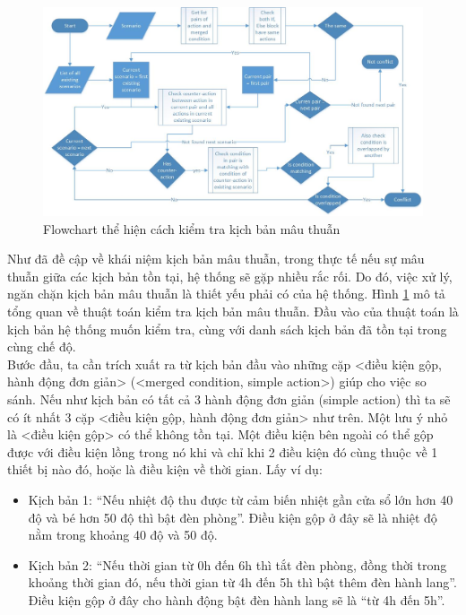 \documentclass[12pt,a4paper,oneside]{extbook}
\begin{document}
\begin{figure}[h]
  \centering
     \includegraphics[width=15cm]{6-Flowchart-Scenario-Validator-How-to-check-conflict}
  \caption{Flowchart thể hiện cách kiểm tra kịch bản mâu thuẫn}\label{fig:6-Flowchart-Scenario-Validator-How-to-check-conflict}
\end{figure}

\noindent
Như đã đề cập về khái niệm kịch bản mâu thuẫn, trong thực tế nếu sự mâu thuẫn giữa các kịch bản tồn tại, hệ thống sẽ gặp nhiều rắc rối. Do đó, việc xử lý, ngăn chặn kịch bản mâu thuẫn là thiết yếu phải có của hệ thống. Hình \ref{fig:6-Flowchart-Scenario-Validator-How-to-check-conflict} mô tả tổng quan về thuật toán kiểm tra kịch bản mâu thuẫn. Đầu vào của thuật toán là kịch bản hệ thống muốn kiểm tra, cùng với danh sách kịch bản đã tồn tại trong cùng chế độ.\\

\noindent
Bước đầu, ta cần trích xuất ra từ kịch bản đầu vào những cặp <điều kiện gộp, hành động đơn giản> (<merged condition, simple action>) giúp cho việc so sánh. Nếu như kịch bản có tất cả 3 hành động đơn giản (simple action) thì ta sẽ có ít nhất 3 cặp <điều kiện gộp, hành động đơn giản> như trên. Một lưu ý nhỏ là <điều kiện gộp> có thể không tồn tại. Một điều kiện bên ngoài có thể gộp được với điều kiện lồng trong nó khi và chỉ khi 2 điều kiện đó cùng thuộc về 1 thiết bị nào đó, hoặc là điều kiện về thời gian. Lấy ví dụ:

	\begin{itemize}[topsep=1mm,itemsep=-0.5mm]
	\item Kịch bản 1: “Nếu nhiệt độ thu được từ cảm biến nhiệt gần cửa sổ lớn hơn 40 độ và bé hơn 50 độ thì bật đèn phòng”. Điều kiện gộp ở đây sẽ là nhiệt độ nằm trong khoảng 40 độ và 50 độ.
	\item Kịch bản 2: “Nếu thời gian từ 0h đến 6h thì tắt đèn phòng, đồng thời trong khoảng thời gian đó, nếu thời gian từ 4h đến 5h thì bật thêm đèn hành lang”. Điều kiện gộp ở đây cho hành động bật đèn hành lang sẽ là “từ 4h đến 5h”.
	\vspace{1mm}
	\end{itemize}
\end{document}
